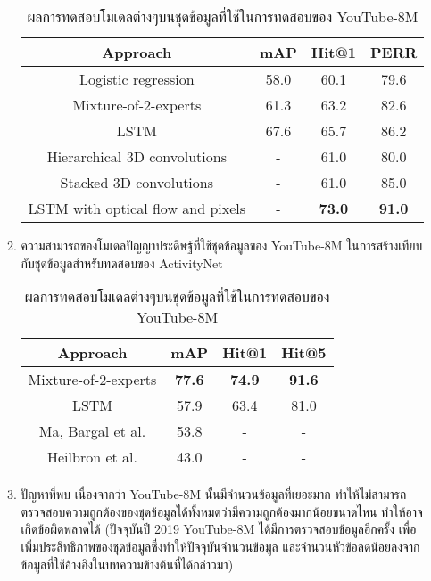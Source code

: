 \begin{enumerate}
\begin{enumerate}
\begin{table}[!ht]
				\centering
				\begin{tabular}{|c|c|c|c|}
					\hline
					{Approach} & {mAP} & Hit@1 & PERR\\
					\hline
					Logistic regression & 58.0 & 60.1 & 79.6\\
					Mixture-of-2-experts & 61.3 & 63.2 & 82.6\\
					LSTM & 67.6 & 65.7 & 86.2\\
					\hline
					Hierarchical 3D convolutions\textsuperscript{\cite{karpathy2014large}} & - & 61.0 & 80.0\\
					Stacked 3D convolutions\textsuperscript{\cite{yue2015beyond}} & - & 61.0 & 85.0\\
					LSTM with optical flow and pixels\textsuperscript{\cite{tran2014c3d}} & - & \textbf{73.0} & \textbf{91.0}\\
					\hline
				\end{tabular}
				\caption{ผลการทดสอบโมเดลต่างๆบนชุดข้อมูลที่ใช้ในการทดสอบของ YouTube-8M}
				\label{tab: youtube_youtube}
			\end{table}
		\item ความสามารถของโมเดลปัญญาประดิษฐ์ที่ใช้ชุดข้อมูลของ YouTube-8M ในการสร้างเทียบกับชุดข้อมูลสำหรับทดสอบของ ActivityNet
			\begin{table}[!ht]
				\centering
				\begin{tabular}{|c|c|c|c|}
					\hline
					{Approach} & {mAP} & Hit@1 & Hit@5\\
					\hline
					Mixture-of-2-experts & \textbf{77.6} & \textbf{74.9} & \textbf{91.6}\\
					LSTM & 57.9 & 63.4 & 81.0\\
					\hline
					Ma, Bargal et al.\textsuperscript{\cite{ma2017less}} & 53.8 & - & -\\
					Heilbron et al.\textsuperscript{\cite{caba2015activitynet}} & 43.0 & - & -\\
					\hline
				\end{tabular}
				\caption{ผลการทดสอบโมเดลต่างๆบนชุดข้อมูลที่ใช้ในการทดสอบของ YouTube-8M}
				\label{tab: youtube_youtube}
			\end{table}
		\item ปัญหาที่พบ
			เนื่องจากว่า YouTube-8M นั้นมีจำนวนข้อมูลที่เยอะมาก ทำให้ไม่สามารถตรวจสอบความถูกต้องของชุดข้อมูลได้ทั้งหมดว่ามีความถูกต้องมากน้อยขนาดไหน 
			ทำให้อาจเกิดข้อผิดพลาดได้ (ปัจจุบันปี 2019 YouTube-8M ได้มีการตรวจสอบข้อมูลอีกครั้ง เพื่อเพิ่มประสิทธิภาพของชุดข้อมูลซึ่งทำให้ปัจจุบันจำนวนข้อมูล 
			และจำนวนหัวข้อลดน้อยลงจากข้อมูลที่ใช้อ้างอิงในบทความข้างต้นที่ได้กล่าวมา)
	\end{enumerate}	
\end{enumerate}
\clearpage

